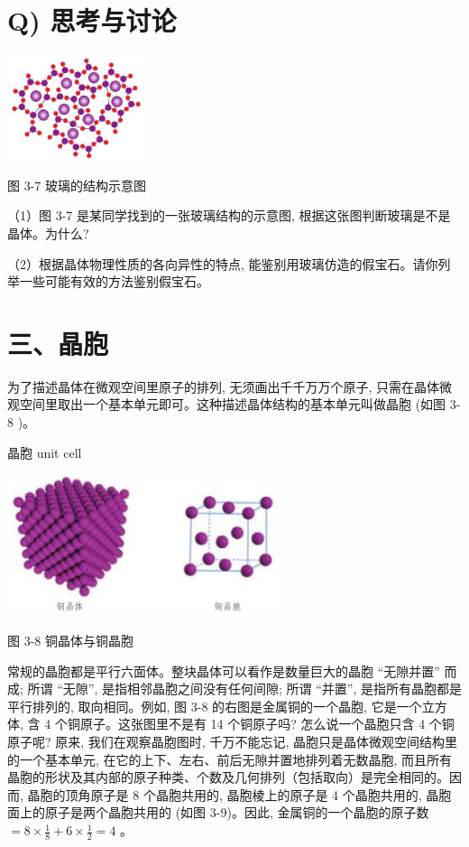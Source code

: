 \documentclass[10pt]{article}
\begin{document}
\section*{Q) 思考与讨论}

\begin{center}
\includegraphics[max width=0.3\textwidth]{images/0190e026-5a11-7df7-bd27-54d09026ba7a_76_276893.jpg}
\end{center}

图 3-7 玻璃的结构示意图

（1）图 3-7 是某同学找到的一张玻璃结构的示意图, 根据这张图判断玻璃是不是晶体。为什么?

（2）根据晶体物理性质的各向异性的特点, 能鉴别用玻璃仿造的假宝石。请你列举一些可能有效的方法鉴别假宝石。

\section*{三、晶胞}

为了描述晶体在微观空间里原子的排列, 无须画出千千万万个原子, 只需在晶体微观空间里取出一个基本单元即可。这种描述晶体结构的基本单元叫做晶胞 (如图 3-8 )。

\begin{mdframed}

晶胞 unit cell

\end{mdframed}

\begin{center}
\includegraphics[max width=0.6\textwidth]{images/0190e026-5a11-7df7-bd27-54d09026ba7a_76_157235.jpg}
\end{center}

图 3-8 铜晶体与铜晶胞

常规的晶胞都是平行六面体。整块晶体可以看作是数量巨大的晶胞 “无隙并置” 而成; 所谓 “无隙”, 是指相邻晶胞之间没有任何间隙; 所谓 “并置”, 是指所有晶胞都是平行排列的, 取向相同。例如, 图 3-8 的右图是金属铜的一个晶胞, 它是一个立方体, 含 4 个铜原子。这张图里不是有 14 个铜原子吗? 怎么说一个晶胞只含 4 个铜原子呢? 原来, 我们在观察晶胞图时, 千万不能忘记, 晶胞只是晶体微观空间结构里的一个基本单元, 在它的上下、左右、前后无隙并置地排列着无数晶胞, 而且所有晶胞的形状及其内部的原子种类、个数及几何排列（包括取向）是完全相同的。因而, 晶胞的顶角原子是 8 个晶胞共用的, 晶胞棱上的原子是 4 个晶胞共用的, 晶胞面上的原子是两个晶胞共用的 (如图 3-9)。因此, 金属铜的一个晶胞的原子数 \(= 8 \times \frac{1}{8} + 6 \times \frac{1}{2} = 4\) 。
\end{document}
